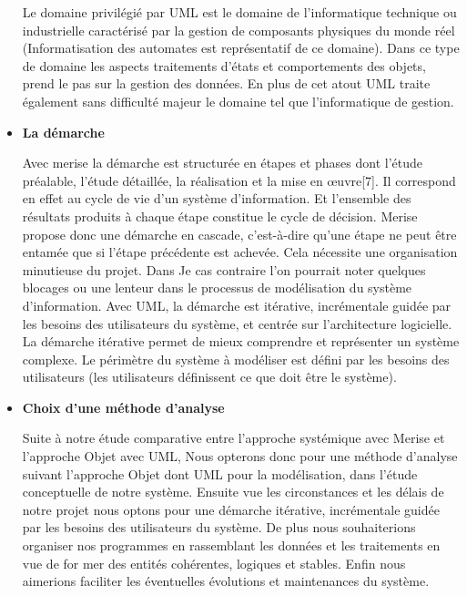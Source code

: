 \begin{itemize}
	      Le domaine privilégié par UML est le domaine de l’informatique technique ou industrielle
	      caractérisé par la gestion de composants physiques du monde réel (Informatisation des automates
	      est représentatif de ce domaine). Dans ce type de domaine les aspects traitements d’états et
	      comportements des objets, prend le pas sur la gestion des données. En plus de cet atout UML
	      traite également sans difficulté majeur le domaine tel que l’informatique de gestion.

	\item \textbf{La démarche}

	      Avec merise la démarche est structurée en étapes et phases dont l’étude préalable, l’étude
	      détaillée, la réalisation et la mise en œuvre[7]. Il correspond en effet au cycle de vie d’un système
	      d’information. Et l’ensemble des résultats produits à chaque étape constitue le cycle de décision.
	      Merise propose donc une démarche en cascade, c’est-à-dire qu’une étape ne peut être entamée
	      que si l’étape précédente est achevée. Cela nécessite une organisation minutieuse du projet.
	      Dans Je cas contraire l’on pourrait noter quelques blocages ou une lenteur dans le processus
	      de modélisation du système d’information. Avec UML, la démarche est itérative, incrémentale
	      guidée par les besoins des utilisateurs du système, et centrée sur l’architecture logicielle. La
	      démarche itérative permet de mieux comprendre et représenter un système complexe. Le
	      périmètre du système à modéliser est défini par les besoins des utilisateurs (les utilisateurs
	      définissent ce que doit être le système).

	\item \textbf{Choix d’une méthode d’analyse}

	      Suite à notre étude comparative entre l’approche systémique avec Merise et l’approche Objet
	      avec UML, Nous opterons donc pour une méthode d’analyse suivant l’approche Objet dont UML
	      pour la modélisation, dans l’étude conceptuelle de notre système. Ensuite vue les circonstances
	      et les délais de notre projet nous optons pour une démarche itérative, incrémentale guidée par
	      les besoins des utilisateurs du système. De plus nous souhaiterions organiser nos programmes
	      en rassemblant les données et les traitements en vue de for mer des entités cohérentes, logiques
	      et stables. Enfin nous aimerions faciliter les éventuelles évolutions et maintenances du système.
\end{itemize}